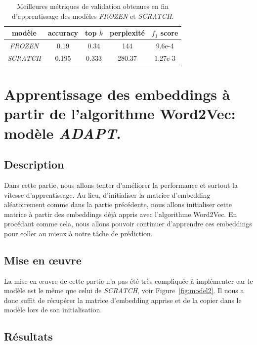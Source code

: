\documentclass[a4paper]{article}
\begin{document}
\begin{table}
    \centering
    \begin{tabular}{|c|c|c|c|c|}
        \hline
        modèle & accuracy  & top $k$  & perplexité  & $f_1$ score \\
        \hline
        \textit{FROZEN} & 0.19 & 0.34  & 144 & 9.6e-4 \\
        \hline
        \textit{SCRATCH} & 0.195 & 0.333  & 280.37 & 1.27e-3 \\
        \hline
    \end{tabular}
    \caption{Meilleures métriques de validation obtenues en fin d'apprentissage des modèles \textit{FROZEN} et \textit{SCRATCH}.}
    \label{tab:metriques model2}
\end{table}


\section{Apprentissage des embeddings à partir de l'algorithme Word2Vec: modèle \textit{ADAPT}.}

\subsection{Description}

Dans cette partie, nous allons tenter d'améliorer la performance et surtout la vitesse d'apprentissage. Au lieu,
d'initialiser la matrice d'embedding aléatoirement comme dans la partie précédente, nous allons initialiser cette 
matrice à partir des embeddings déjà appris avec l'algorithme Word2Vec. En procédant comme cela, nous allons pouvoir
continuer d'apprendre ces embeddings pour coller au mieux à notre tâche de prédiction.

\subsection{Mise en \oe uvre}

La mise en \oe uvre de cette partie n'a pas été très compliquée à implémenter car le modèle est le même que celui de 
\textit{SCRATCH}, voir Figure~\ref{fig:model2}. Il nous a donc suffit de récupérer la matrice d'embedding apprise et de 
la copier dans le modèle lors de son initialisation.

\subsection{Résultats}
\end{document}
